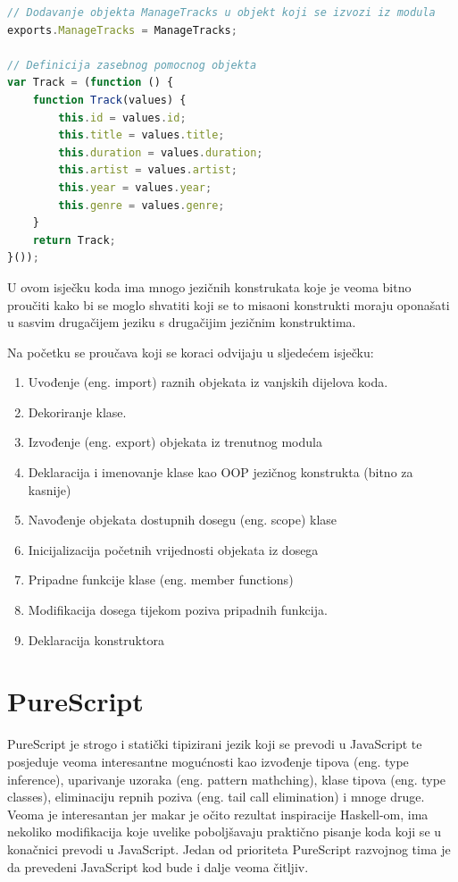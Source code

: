 \documentclass[times, utf8, zavrsni]{fer}
\begin{document}
\begin{lstlisting}[language=JavaScript, basicstyle=\small\linespread{0.8}]
// Dodavanje objekta ManageTracks u objekt koji se izvozi iz modula
exports.ManageTracks = ManageTracks;

// Definicija zasebnog pomocnog objekta
var Track = (function () {
    function Track(values) {
        this.id = values.id;
        this.title = values.title;
        this.duration = values.duration;
        this.artist = values.artist;
        this.year = values.year;
        this.genre = values.genre;
    }
    return Track;
}());


\end{lstlisting}

U ovom isječku koda ima mnogo jezičnih konstrukata koje je veoma bitno proučiti kako bi se moglo shvatiti koji se to misaoni konstrukti moraju oponašati u sasvim drugačijem jeziku s drugačijim jezičnim konstruktima.

Na početku se proučava koji se koraci odvijaju u sljedećem isječku:

\begin{enumerate}
\item Uvođenje (eng. import) raznih objekata iz vanjskih dijelova koda.
\item Dekoriranje klase.
\item Izvođenje (eng. export) objekata iz trenutnog modula
\item Deklaracija i imenovanje klase kao OOP jezičnog konstrukta (bitno za kasnije)
\item Navođenje objekata dostupnih dosegu (eng. scope) klase
\item Inicijalizacija početnih vrijednosti objekata iz dosega
\item Pripadne funkcije klase (eng. member functions)
\item Modifikacija dosega tijekom poziva pripadnih funkcija.
\item Deklaracija konstruktora
\end{enumerate}

\section{PureScript}
PureScript je strogo i statički tipizirani jezik koji se prevodi u JavaScript te posjeduje veoma interesantne mogućnosti kao izvođenje tipova (eng. type inference), uparivanje uzoraka (eng. pattern mathching), klase tipova (eng. type classes), eliminaciju repnih poziva (eng. tail call elimination) i mnoge druge. Veoma je interesantan jer makar je očito rezultat inspiracije Haskell-om, ima nekoliko modifikacija koje uvelike poboljšavaju praktično pisanje koda koji se u konačnici prevodi u JavaScript. Jedan od prioriteta PureScript razvojnog tima je da prevedeni JavaScript kod bude i dalje veoma čitljiv.
\end{document}
